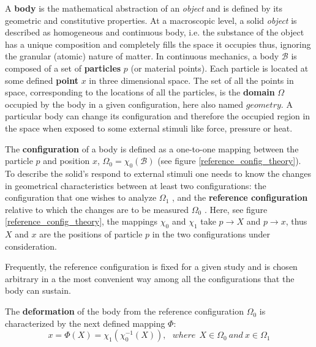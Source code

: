 	A \textbf{body} is the mathematical abstraction of an \textit{object} and is defined by its geometric and constitutive properties.  At a macroscopic level, a solid \textit{object} is described as homogeneous and continuous body, i.e. the substance of the object has a unique composition and completely fills the space it occupies thus, ignoring the granular (atomic) nature of matter. In continuous mechanics, a body $\mathcal{B}$ is composed of a set of \textbf{particles} $p$  (or material points). Each particle is located at some defined \textbf{point}  $x$ in three dimensional space. The set of all the points in space, corresponding to the locations of all the particles, is the \textbf{domain} $\Omega$  occupied by the body in a given configuration, here also named $geometry$. A particular body can change its configuration and therefore the occupied region in the space when exposed to some external stimuli like force, pressure or heat.
	
 The \textbf{configuration} of a body is defined as a one-to-one mapping between the particle $p$ and position $x$, $\Omega_0 = \chi_0 (\mathcal{B})$ (see figure \ref{reference_config_theory}). To describe the solid's respond to external stimuli one needs to know the changes in geometrical characteristics between at least two configurations: the configuration that one wishes to analyze $\Omega_1$ , and the \textbf{reference configuration} relative to which the changes are to be measured $\Omega_0$  . Here, see figure \ref{reference_config_theory}, the mappings $\chi_0$ and $\chi_1$ take $p \rightarrow X$ and $p \rightarrow x$, thus $X$ and $x$ are the positions of particle $p$ in the two configurations under consideration.

Frequently, the reference configuration is fixed for a given study and is chosen arbitrary in a the most convenient way among all the configurations that the body can sustain. 
 
 The \textbf{deformation} of the body from the reference configuration $\Omega_0$ is characterized by the next defined mapping $\Phi$:
 \begin{equation} 
 x = \Phi(X) = \chi_1(\chi_0^{-1}(X)), \ \ \  where \ \  X \in \Omega_0 \ and \ x \in \Omega_1
 \label{referenceToCurrentCoordinates}
 \end{equation}
 
